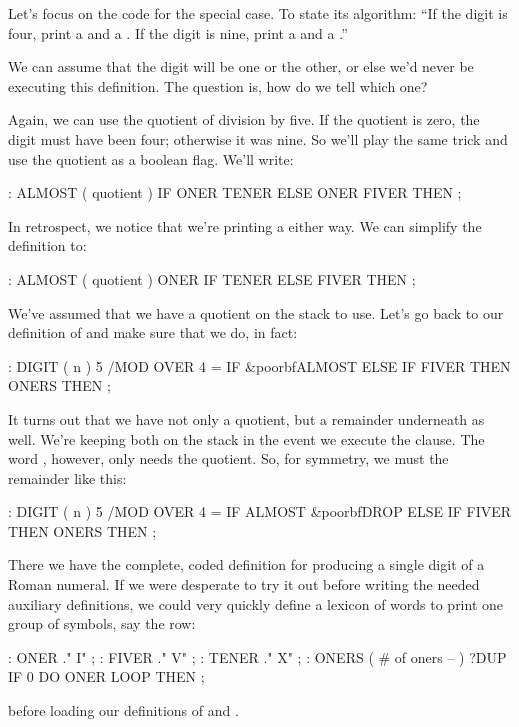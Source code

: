 Let's focus on the code for the special case. To state its algorithm: ``If
the digit is four, print a  and a . If the digit
is nine, print a  and a .''

We can assume that the digit will be one or the other, or else we'd never
be executing this definition. The question is, how do we tell which one?

Again, we can use the quotient of division by five. If the quotient is
zero, the digit must have been four; otherwise it was nine. So we'll play
the same trick and use the quotient as a boolean flag. We'll write:

\begin{Code}
: ALMOST  ( quotient )
     IF  ONER TENER  ELSE  ONER FIVER  THEN ;
\end{Code}
In retrospect, we notice that we're printing a  either way. We
can simplify the definition to:

\begin{Code}
: ALMOST  ( quotient )
     ONER  IF TENER ELSE FIVER THEN ;
\end{Code}
We've assumed that we have a quotient on the stack to use. Let's go back
to our definition of  and make sure that we do, in fact:

\begin{Code}[commandchars=\&\{\}]
: DIGIT  ( n )
     5 /MOD  OVER 4 =  IF  &poorbf{ALMOST}  ELSE
     IF FIVER THEN  ONERS  THEN ;
\end{Code}
It turns out that we have not only a quotient, but a remainder underneath
as well. We're keeping both on the stack in the event we execute the
 clause. The word , however, only needs the
quotient. So, for symmetry, we must  the remainder like this:

\begin{Code}[commandchars=\&\{\}]
: DIGIT  ( n )
     5 /MOD  OVER 4 =  IF  ALMOST  &poorbf{DROP}  ELSE
     IF FIVER THEN  ONERS  THEN ;
\end{Code}
There we have the complete, coded definition for producing a single digit
of a Roman numeral. If we were desperate to try it out before writing the
needed auxiliary definitions, we could very quickly define a lexicon of
words to print one group of symbols, say the  row:

\begin{Code}
: ONER    ." I" ;
: FIVER   ." V" ;
: TENER   ." X" ;
: ONERS  ( # of oners -- )
     ?DUP IF 0 DO  ONER  LOOP  THEN ;
\end{Code}
before loading our definitions of  and .


